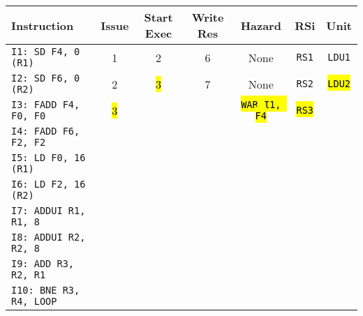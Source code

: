 \begin{enumerate}
    \begin{table}[!htp]
        \centering
        \begin{adjustbox}{width={\textwidth},totalheight={\textheight},keepaspectratio}
        \begin{tabular}{@{} l c c c c c c @{}}
            \toprule
            \textbf{Instruction} & \textbf{Issue} & \textbf{Start Exec} & \textbf{Write Res} & \textbf{Hazard} & \textbf{RSi} & \textbf{Unit} \\
            \midrule
            \texttt{I1: SD F4, 0 (R1)}      & 1 & 2 & 6 & None  & \texttt{RS1}   & \texttt{LDU1}  \\ [.5em]
            \texttt{I2: SD F6, 0 (R2)}      & 2 & \hl{3} & 7 & None  & \texttt{RS2}   & \hl{\texttt{LDU2}}  \\ [.5em]
            \texttt{I3: FADD F4, F0, F0}    & \hl{3} &   &   & \hl{\texttt{WAR I1, F4}} & \hl{\texttt{RS3}} &       \\ [.5em]
            \texttt{I4: FADD F6, F2, F2}    &   &   &   &       &       &       \\ [.5em]
            \texttt{I5: LD F0, 16 (R1)}     &   &   &   &       &       &       \\ [.5em]
            \texttt{I6: LD F2, 16 (R2)}     &   &   &   &       &       &       \\ [.5em]
            \texttt{I7: ADDUI R1, R1, 8}    &   &   &   &       &       &       \\ [.5em]
            \texttt{I8: ADDUI R2, R2, 8}    &   &   &   &       &       &       \\ [.5em]
            \texttt{I9: ADD R3, R2, R1}     &   &   &   &       &       &       \\ [.5em]
            \texttt{I10: BNE R3, R4, LOOP}   &   &   &   &       &       &       \\
            \bottomrule
        \end{tabular}
        \end{adjustbox}
    \end{table}
    

\end{enumerate}
